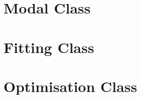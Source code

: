 \section{Modal Class}
\clearpage

\section{Fitting Class}
\clearpage
%

\section{Optimisation Class}
\clearpage
